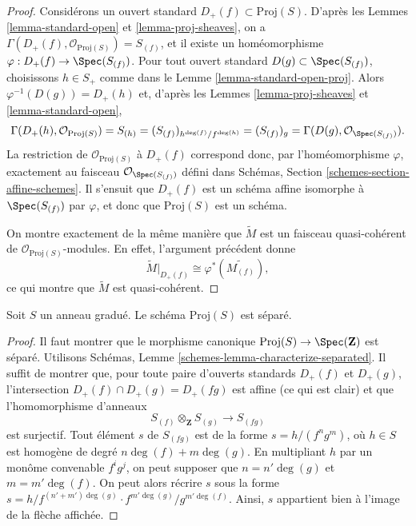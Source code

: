 \begin{proof}
Considérons un ouvert standard $D_{+}(f) \subset \text{Proj}(S)$.
D'après les Lemmes \ref{lemma-standard-open} et \ref{lemma-proj-sheaves},
on a $\Gamma(D_{+}(f), \mathcal{O}_{\text{Proj}(S)}) = S_{(f)}$, et il existe
un homéomorphisme $\varphi : D_{+}(f) \to \Spec(S_{(f)})$.
Pour tout ouvert standard $D(g) \subset \Spec(S_{(f)})$, choisissons
$h \in S_{+}$ comme dans le Lemme \ref{lemma-standard-open-proj}.
Alors $\varphi^{-1}(D(g)) = D_{+}(h)$ et, d'après les Lemmes
\ref{lemma-proj-sheaves} et \ref{lemma-standard-open},
$$
\Gamma(D_{+}(h), \mathcal{O}_{\text{Proj}(S)})
=
S_{(h)}
=
(S_{(f)})_{h^{\deg(f)}/f^{\deg(h)}}
=
(S_{(f)})_g
=
\Gamma(D(g), \mathcal{O}_{\Spec(S_{(f)})}).
$$
La restriction de $\mathcal{O}_{\text{Proj}(S)}$ à $D_{+}(f)$ correspond donc,
par l'homéomorphisme $\varphi$, exactement au faisceau
$\mathcal{O}_{\Spec(S_{(f)})}$ défini dans Schémas,
Section \ref{schemes-section-affine-schemes}. Il s'ensuit que $D_{+}(f)$ est
un schéma affine isomorphe à $\Spec(S_{(f)})$ par $\varphi$, et donc que
$\text{Proj}(S)$ est un schéma.

\medskip\noindent
On montre exactement de la même manière que $\widetilde M$ est un faisceau
quasi-cohérent de $\mathcal{O}_{\text{Proj}(S)}$-modules. En effet, l'argument
précédent donne
$$
\widetilde M|_{D_{+}(f)} \cong \varphi^*\left(\widetilde{M_{(f)}}\right),
$$
ce qui montre que $\widetilde M$ est quasi-cohérent.
\end{proof}

\begin{lemma}
\label{lemma-proj-separated}
Soit $S$ un anneau gradué. Le schéma $\text{Proj}(S)$ est séparé.
\end{lemma}

\begin{proof}
Il faut montrer que le morphisme canonique
$\text{Proj}(S) \to \Spec(\mathbf{Z})$ est séparé. Utilisons Schémas,
Lemme \ref{schemes-lemma-characterize-separated}. Il suffit de montrer que,
pour toute paire d'ouverts standards $D_{+}(f)$ et $D_{+}(g)$,
l'intersection $D_{+}(f) \cap D_{+}(g) = D_{+}(fg)$ est affine (ce qui est
clair) et que l'homomorphisme d'anneaux
$$
S_{(f)} \otimes_{\mathbf{Z}} S_{(g)} \longrightarrow S_{(fg)}
$$
est surjectif. Tout élément $s$ de $S_{(fg)}$ est de la forme
$s = h/(f^ng^m)$, où $h \in S$ est homogène de degré
$n\deg(f) + m\deg(g)$. En multipliant $h$ par un monôme convenable
$f^ig^j$, on peut supposer que $n = n' \deg(g)$ et
$m = m' \deg(f)$. On peut alors récrire $s$ sous la forme
$s = h/f^{(n' + m')\deg(g)} \cdot
f^{m'\deg(g)}/g^{m'\deg(f)}$. Ainsi, $s$ appartient bien à l'image de la
flèche affichée.
\end{proof}


